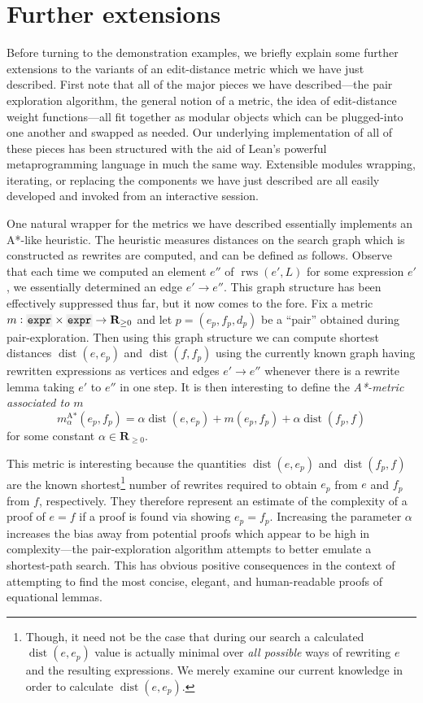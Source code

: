 \documentclass[a4paper]{article}
\DeclareMathOperator{\rws}{rws}
\DeclareMathOperator{\dist}{dist}
\newcommand{\RR}{\mathbf{R}}
\theoremstyle{plain}
\theoremstyle{definition}
\newcommand{\xx}[1]{{\colorbox{gray!15}{\raisebox{0em}[0.5em][0pt]{\makebox[\width-0.4em]{\texttt{#1}}}}}}
\newcommand{\expr}{\xx{expr}}
\begin{document}
\section{Further extensions}

Before turning to the demonstration examples, we briefly explain some further extensions to the variants of an edit-distance metric which we have just described. First note that all of the major pieces we have described---the pair exploration algorithm, the general notion of a metric, the idea of edit-distance weight functions---all fit together as modular objects which can be plugged-into one another and swapped as needed. Our underlying implementation of all of these pieces has been structured with the aid of Lean's powerful metaprogramming language in much the same way. Extensible modules wrapping, iterating, or replacing the components we have just described are all easily developed and invoked from an interactive session.

One natural wrapper for the metrics we have described essentially implements an A*-like heuristic. The heuristic measures distances on the search graph which is constructed as rewrites are computed, and can be defined as follows. Observe that each time we computed an element $e''$ of $\rws(e', L)$ for some expression $e'$, we essentially determined an edge $e' \to e''$. This graph structure has been effectively suppressed thus far, but it now comes to the fore. Fix a metric $m : \expr{} \times \expr{} \to \RR_{\geq 0}$ and let $p = (e_p, f_p, d_p)$ be a ``pair'' obtained during pair-exploration. Then using this graph structure we can compute shortest distances $\dist(e, e_p)$ and $\dist(f, f_p)$ using the currently known graph having rewritten expressions as vertices and edges $e' \to e''$ whenever there is a rewrite lemma taking $e' $ to $e''$ in one step. It is then interesting to define the \textit{A*-metric associated to $m$}
\begin{equation*}
  m^\text{A*}_{\alpha}(e_p, f_p) = \alpha \dist(e, e_p) + m(e_p, f_p) + \alpha \dist(f_p, f)
\end{equation*}
for some constant $\alpha \in \RR_{\geq 0}$.

This metric is interesting because the quantities $\dist(e, e_p)$ and $\dist(f_p, f)$ are the known shortest\footnote{Though, it need not be the case that during our search a calculated $\dist(e, e_p)$ value is actually minimal over \textit{all possible} ways of rewriting $e$ and the resulting expressions. We merely examine our current knowledge in order to calculate $\dist(e, e_p)$.} number of rewrites required to obtain $e_p$ from $e$ and $f_p$ from $f$, respectively. They therefore represent an estimate of the complexity of a proof of $e = f$ if a proof is found via showing $e_p = f_p$. Increasing the parameter $\alpha$ increases the bias away from potential proofs which appear to be high in complexity---the pair-exploration algorithm attempts to better emulate a shortest-path search. This has obvious positive consequences in the context of attempting to find the most concise, elegant, and human-readable proofs of equational lemmas.
\end{document}
